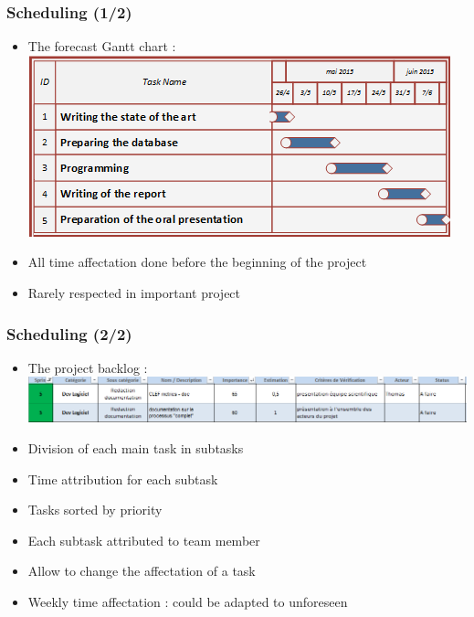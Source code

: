 \documentclass[xcolor=table]{beamer}
\begin{document}
\begin{frame} \frametitle{Scheduling (1/2)}

\begin{itemize}
\item The forecast Gantt chart  :
\includegraphics[scale=0.80]{GanttPrez.png}
\item All time affectation done before the beginning of the project
\item Rarely respected in important project
\end{itemize}

\end{frame}


\begin{frame} \frametitle{Scheduling (2/2)}


\begin{itemize}
\item The project backlog  :
\includegraphics[scale=0.40]{backlog.png}
\item Division of each main task in subtasks
\item Time attribution for each subtask
\item Tasks sorted by priority
\item Each subtask attributed to team member
\item Allow to change the affectation of a task
\item Weekly time affectation : could be adapted to unforeseen
\end{itemize}


\end{frame}
\end{document}
